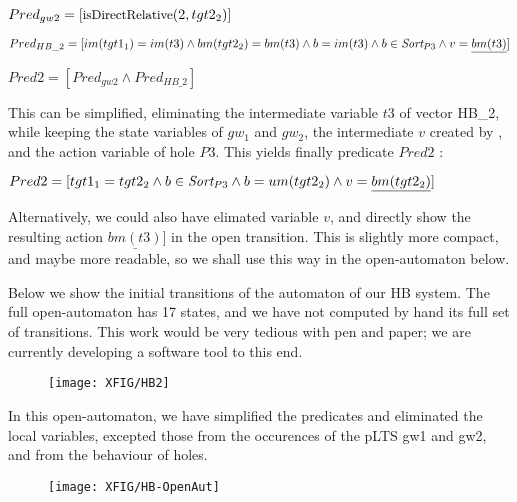 \documentclass{lncs/llncs}
\begin{document}
$Pred_{gw2} = [\mbox{\boldmath\small isDirectRelative}(2,tgt2_2)]$

$Pred_{HB\_2} = [im(tgt1_1) = im(t3) \land bm(tgt2_2) = bm(t3) \land b= im(t3) \land b\in 
\Sort_{P3}  \land v = \underline{bm(t3)}]$

$Pred2 = [Pred_{gw2} \land Pred_{HB\_2} ] $

\medskip
This can be simplified, eliminating the intermediate variable $t3$ of vector
HB\_2, while keeping the state variables of $gw_1$ and $gw_2$, the
intermediate $v$ created by \TrDeux, and the action variable of hole 
$P3$. This yields finally predicate $Pred2$ :

$Pred2 = [tgt1_1=tgt2_2 \land
  b\in \Sort_{P3} \land b=um(tgt2_2) \land v = \underline{bm(tgt2_2)}]
$

\medskip
Alternatively, we could also have elimated variable $v$, and directly
show the resulting action $\underline{bm(t3)}]$ in the open
  transition. This is slightly more compact, and maybe more readable,
  so we shall use this way in the open-automaton below.

\newpage
 
Below we show the initial transitions of the automaton of our HB
system. The full open-automaton has 17 states, and we have not
computed by hand its full set of transitions. This work would be very
tedious with pen and paper; we are currently developing a software
tool to this end.

\begin{figure}[h]
  \texttt{[image: XFIG/HB2]}
\end{figure}

In this open-automaton, we have simplified the predicates and
eliminated the local variables, excepted those from the occurences of
the pLTS gw1 and gw2, and from the behaviour of holes.

\begin{figure}[h]
  \texttt{[image: XFIG/HB-OpenAut]}
\end{figure}
\newpage
\end{document}
